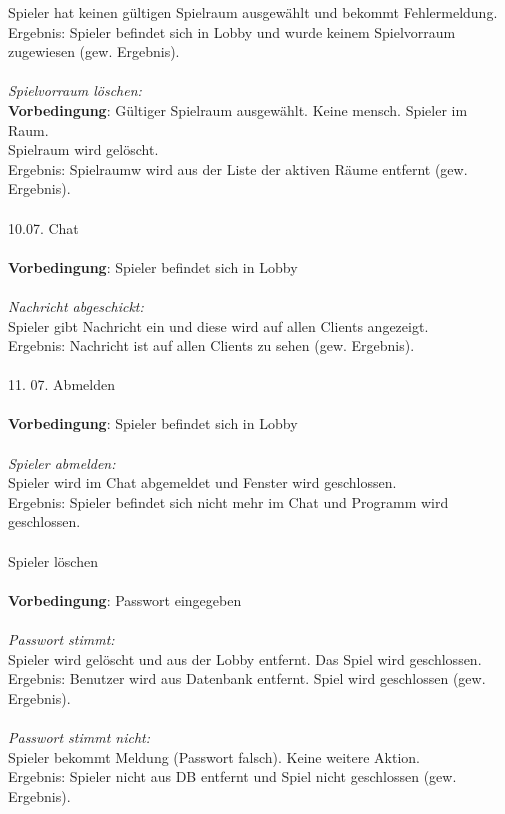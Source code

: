 \documentclass[10pt]{report}
\begin{document}
		Spieler hat keinen g\"ultigen Spielraum ausgew\"ahlt und bekommt Fehlermeldung. \\
		Ergebnis: Spieler befindet sich in Lobby und wurde keinem Spielvorraum zugewiesen (gew. 					Ergebnis). \\
		\\
		\textsl{Spielvorraum löschen:} \\
		\textbf{Vorbedingung}: Gültiger Spielraum ausgewählt. Keine mensch. Spieler im Raum. \\
		Spielraum wird gelöscht.\\
		Ergebnis: Spielraumw wird aus der Liste der aktiven Räume entfernt (gew. Ergebnis). \\
		\\
		10.07. Chat \\
		\\
		\textbf{Vorbedingung}: Spieler befindet sich in Lobby \\
		\\
		\textsl{Nachricht abgeschickt:} \\
		Spieler gibt Nachricht ein und diese wird auf allen Clients angezeigt. \\
		Ergebnis: Nachricht ist auf allen Clients zu sehen (gew. Ergebnis). \\
		\\
		11. 07. Abmelden \\
		\\
		\textbf{Vorbedingung}: Spieler befindet sich in Lobby \\
		\\
		\textsl{Spieler abmelden:} \\
		Spieler wird im Chat abgemeldet und Fenster wird geschlossen. \\
		Ergebnis: Spieler befindet sich nicht mehr im Chat und Programm wird geschlossen. \\
		\\
		Spieler l\"oschen \\
		\\
		\textbf{Vorbedingung}: Passwort eingegeben \\
		\\
		\textsl{Passwort stimmt:} \\
		Spieler wird gel\"oscht und aus der Lobby entfernt. Das Spiel wird geschlossen. \\
		Ergebnis: Benutzer wird aus Datenbank entfernt. Spiel wird geschlossen (gew. Ergebnis). \\
		\\
		\textsl{Passwort stimmt nicht:} \\
		Spieler bekommt Meldung (Passwort falsch). Keine weitere Aktion. \\
		Ergebnis: Spieler nicht aus DB entfernt und Spiel nicht geschlossen (gew. Ergebnis). \\
		\\
		
\end{document}
